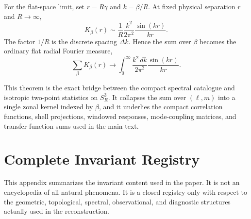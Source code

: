 \documentclass[aps,prd,onecolumn,superscriptaddress,longbibliography,nofootinbib,notitlepage]{revtex4-2}
\begin{document}
For the flat-space limit, set $r=R\gamma$ and $k=\beta/R$. At fixed physical
separation $r$ and $R\to\infty$,
\begin{equation}
  K_\beta(r)
  \sim
  \frac{1}{R}
  \frac{k^2}{2\pi^2}
  \frac{\sin(kr)}{kr}.
\end{equation}
The factor $1/R$ is the discrete spacing $\Delta k$. Hence the sum over $\beta$
becomes the ordinary flat radial Fourier measure,
\begin{equation}
  \sum_\beta K_\beta(r)
  \longrightarrow
  \int_0^\infty
  \frac{k^2\,dk}{2\pi^2}
  \frac{\sin(kr)}{kr}.
\end{equation}

This theorem is the exact bridge between the compact spectral catalogue and
isotropic two-point statistics on $S^3_R$. It collapses the sum over $(\ell,m)$
into a single zonal kernel indexed by $\beta$, and it underlies the compact
correlation functions, shell projections, windowed responses, mode-coupling
matrices, and transfer-function sums used in the main text.

\section{Complete Invariant Registry}
\label{app:complete-registry}

This appendix summarizes the invariant content used in the paper. It is not an
encyclopedia of all natural phenomena. It is a closed registry only with respect
to the geometric, topological, spectral, observational, and diagnostic structures
actually used in the reconstruction.
\end{document}
